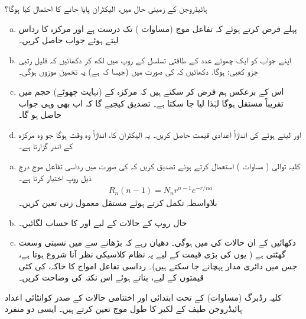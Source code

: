 ہائیڈروجن کے زمینی حال میں، الیکٹران پایا جانے کا احتمال کیا ہوگا؟ 
\begin{enumerate}[a.]
\item
پہلے فرض کرتے ہوئے کہ تفاعل موج (مساوات )  تک درست ہے اور مرکزہ کا رداس  لیتے ہوئے  جواب حاصل کریں۔ 
\item
اپنے جواب کو ایک چھوٹے عدد  کے طاقتی تسلسل کے روپ میں لکھ کر دکھائیں کہ قلیل  رتبی جزو کعبی:  ہوگا. دکھائیں کہ  کی صورت میں (جیسا کہ ہے) یہ تخمین موزوں ہوگی۔
 \item
اس کے برعکس ہم فرض کر سکتے ہیں کہ مرکزہ کے (نہایت چھوٹے) حجم میں  تقریباً مستقل ہوگا لہٰذا  لیا جا سکتا ہے۔ تصدیق کیجیے گا کہ اب بھی وہی جواب حاصل ہو گا۔
\item
{} اور  لیتے ہوئے  کی اندازاً اعدادی قیمت حاصل کریں۔ یہ الیکٹران کا، اندازاً وہ وقت ہوگا جو وہ مرکزہ کے اندر گزارتا ہے۔ 
\end{enumerate}
\begin{enumerate}[a.]
\item
کلیہ توالی ( مساوات ) استعمال کرتے ہوئے تصدیق کریں کہ  کی صورت میں رداسی تفاعل موج درج ذیل روپ اختیار کرتا ہے۔ 
\begin{align*}
R_n (n - 1) = N_n r^{n - 1} e^{-r/na}
\end{align*}
بلاواسطہ تکمل کرتے ہوئے مستقل معمول زنی  تعین کریں۔
\item
حال  روپ کے حالات کے لیے  اور  کا حساب لگائیں۔
\item
دکھائیں کے ان حالات کی  میں   ہوگی۔ دھیان رہے کہ  بڑھانے سے  میں نسبتی وسعت گھٹتی ہے ( یوں  کی بڑی قیمت کے لیے یہ نظام کلاسیکی نظر آنا شروع ہوتا ہے، جس میں دائری مدار پہچانے جا سکتے ہیں)۔ رداسی تفاعل امواج کا خاکہ،  کی کئی قیمتوں کے لیے، بناتے ہوئے اس نکتہ کی وضاحت کریں۔
\end{enumerate}
\quad
 کلیہ رڈبرگ (مساوات) کے تحت ابتدائی اور اختتامی حالات کے صدر کوانٹائی اعداد ہائیڈروجن طیف کے لکیر کا طول موج تعین کرتے ہیں۔ ایسی دو منفرد
